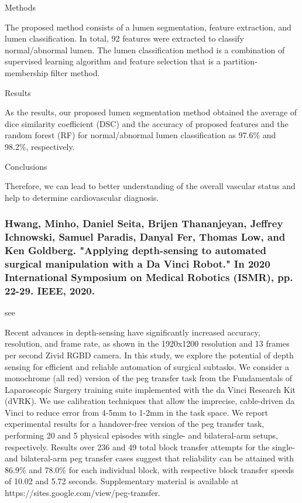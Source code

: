 \documentclass[conference]{IEEEtran}
\begin{document}
Methods

The proposed method consists of a lumen segmentation, feature extraction, and lumen classification. In total, 92 features were extracted to classify normal/abnormal lumen. The lumen classification method is a combination of supervised learning algorithm and feature selection that is a partition-membership filter method.

Results

As the results, our proposed lumen segmentation method obtained the average of dice similarity coefficient (DSC) and the accuracy of proposed features and the random forest (RF) for normal/abnormal lumen classification as 97.6\% and 98.2\%, respectively.

Conclusions

Therefore, we can lead to better understanding of the overall vascular status and help to determine cardiovascular diagnosis.

\medskip
\subsubsection{Hwang, Minho, Daniel Seita, Brijen Thananjeyan, Jeffrey Ichnowski, Samuel Paradis, Danyal Fer, Thomas Low, and Ken Goldberg. "Applying depth-sensing to automated surgical manipulation with a Da Vinci Robot." In 2020 International Symposium on Medical Robotics (ISMR), pp. 22-29. IEEE, 2020.}
see \cite{hwang2020applying}

Recent advances in depth-sensing have significantly increased accuracy, resolution, and frame rate, as shown in the 1920x1200 resolution and 13 frames per second Zivid RGBD camera. In this study, we explore the potential of depth sensing for efficient and reliable automation of surgical subtasks. We consider a monochrome (all red) version of the peg transfer task from the Fundamentals of Laparoscopic Surgery training suite implemented with the da Vinci Research Kit (dVRK). We use calibration techniques that allow the imprecise, cable-driven da Vinci to reduce error from 4-5mm to 1-2mm in the task space. We report experimental results for a handover-free version of the peg transfer task, performing 20 and 5 physical episodes with single- and bilateral-arm setups, respectively. Results over 236 and 49 total block transfer attempts for the single- and bilateral-arm peg transfer cases suggest that reliability can be attained with 86.9\% and 78.0\% for each individual block, with respective block transfer speeds of 10.02 and 5.72 seconds. Supplementary material is available at https://sites.google.com/view/peg-transfer.
\end{document}

